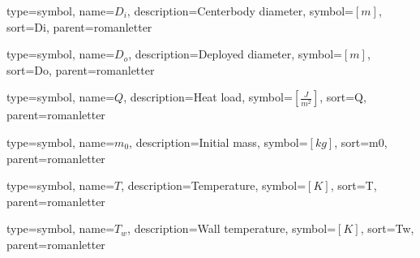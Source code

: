 {
type=symbol, %
name={\ensuremath{D_i}}, %
description={Centerbody diameter}, %
symbol={$\left[m \right]$}, %
sort=Di, %
parent=romanletter %
}

{
type=symbol, %
name={\ensuremath{D_o}}, %
description={Deployed diameter}, %
symbol={$\left[m \right]$}, %
sort=Do, %
parent=romanletter %
}

{
type=symbol, %
name={\ensuremath{Q}}, %
description={Heat load}, %
symbol={$\left[\frac{J}{m^2} \right]$}, %
sort=Q, %
parent=romanletter %
}

{
type=symbol, %
name={\ensuremath{m_0}}, %
description={Initial mass}, %
symbol={$\left[kg \right]$}, %
sort=m0, %
parent=romanletter %
}


{
	type=symbol, %
	name={\ensuremath{T}}, %
	description={Temperature}, %
	symbol={$\left[K\right]$}, %
	sort=T, %
	parent=romanletter %
}

{
	type=symbol, %
	name={\ensuremath{T_w}}, %
	description={Wall temperature}, %
	symbol={$\left[K\right]$}, %
	sort=Tw, %
	parent=romanletter %
}

